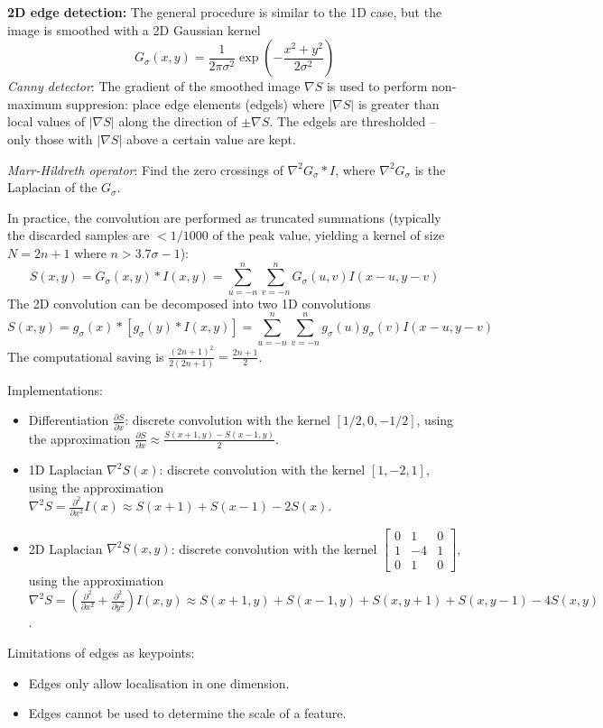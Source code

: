 \documentclass[12pt]{article}
\begin{document}
\textbf{2D edge detection:} The general procedure is similar to the 1D case, but the image is smoothed with a 2D Gaussian kernel
$$
G_\sigma(x, y) = \frac{1}{2\pi\sigma^2} \exp\left(-\frac{x^2 + y^2}{2\sigma^2}\right)
$$
\textit{Canny detector}: The gradient of the smoothed image $\nabla S$ is used to perform non-maximum suppresion: place edge elements (edgels) where $|\nabla S|$ is greater than local values of $|\nabla S|$ along the direction of $\pm \nabla S$. 
The edgels are thresholded -- only those with $|\nabla S|$ above a certain value are kept.

\textit{Marr-Hildreth operator}: Find the zero crossings of $\nabla^2 G_\sigma * I$, where $\nabla^2 G_\sigma$ is the Laplacian of the $G_\sigma$.

In practice, the convolution are performed as truncated summations (typically the discarded samples are $< 1/1000$ of the peak value, yielding a kernel of size $N = 2n+1$ where $n > 3.7 \sigma - 1$):
$$
S(x,y) = G_\sigma(x,y) * I(x,y) = \sum_{u=-n}^{n} \sum_{v=-n}^{n} G_\sigma(u,v) I(x-u, y-v)
$$
The 2D convolution can be decomposed into two 1D convolutions
$$
S(x,y) = g_\sigma(x) * [g_\sigma(y) * I(x,y)] = \sum_{u = -n}^{n} \sum_{v = -n}^{n} g_\sigma(u) g_\sigma(v) I(x-u, y-v)
$$
The computational saving is $\frac{(2n+1)^2}{2(2n+1)} = \frac{2n+1}{2}$.

Implementations:
\begin{itemize}
    \item Differentiation $\frac{\partial S}{\partial x}$: discrete convolution with the kernel $[1/2, 0, -1/2]$, using the approximation $\frac{\partial S}{\partial x} \approx \frac{S(x+1,y) - S(x-1,y)}{2}$.
    \item 1D Laplacian $\nabla^2S(x)$: discrete convolution with the kernel $[1, -2, 1]$, using the approximation $\nabla^2 S = \frac{\partial^2}{\partial x^2} I(x) \approx S(x+1) + S(x-1) - 2S(x)$.
    \item 2D Laplacian $\nabla^2S(x,y)$: discrete convolution with the kernel $\begin{bmatrix}
        0 & 1 & 0 \\
        1 & -4 & 1 \\
        0 & 1 & 0
    \end{bmatrix}$, using the approximation $\nabla^2 S = (\frac{\partial^2}{\partial x^2} + \frac{\partial^2}{\partial y^2})I(x,y) \approx S(x+1,y) + S(x-1,y) + S(x,y+1) + S(x,y-1) - 4S(x,y)$.
\end{itemize}

Limitations of edges as keypoints:
\begin{itemize}
    \item Edges only allow localisation in one dimension.
    \item Edges cannot be used to determine the scale of a feature.
\end{itemize}
\end{document}
